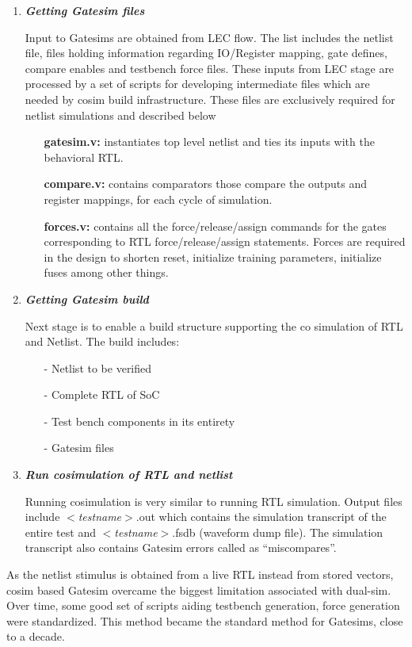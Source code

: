 \begin{enumerate}
	\item \emph{\bf Getting Gatesim files}

	Input to Gatesims are obtained from LEC flow. The list includes the netlist file, files holding information regarding IO/Register mapping, gate defines, compare enables and testbench force files. These inputs from LEC stage are processed by a set of scripts for developing intermediate files which are needed by cosim build infrastructure. These files are exclusively required for netlist simulations and described below
	\begin{itemize}
		\item[]{\bf gatesim.v:} instantiates top level netlist and ties its inputs with the behavioral RTL.
		\item[]{\bf compare.v:} contains comparators those compare the outputs and register mappings, for each cycle of simulation.
		\item[]{\bf forces.v:} contains all the force/release/assign commands for the gates corresponding to RTL force/release/assign statements. Forces are required in the design to shorten reset, initialize training parameters, initialize fuses among other things.
	\end{itemize}

	\item \emph{\bf Getting Gatesim build} 

	Next stage is to enable a build structure supporting the co simulation of RTL and Netlist. The build includes:
	\begin{itemize}
		\item[-]Netlist to be verified
		\item[-]Complete RTL of SoC
		\item[-]Test bench components in its entirety
		\item[-]Gatesim files
	\end{itemize}

	\item \emph{\bf Run cosimulation of RTL and netlist}

	Running cosimulation is very similar to running RTL simulation. Output files include $<${\it testname}$>$.out which contains the simulation transcript of the entire test and $<${\it testname}$>$.fsdb (waveform dump file). The simulation transcript also contains Gatesim errors called as ``miscompares''.
\end{enumerate}


As the netlist stimulus is obtained from a live RTL instead from stored vectors, cosim based Gatesim overcame the biggest limitation associated with dual-sim. Over time, some good set of scripts aiding testbench generation, force generation were standardized. This method became the standard method for Gatesims, close to a decade.


